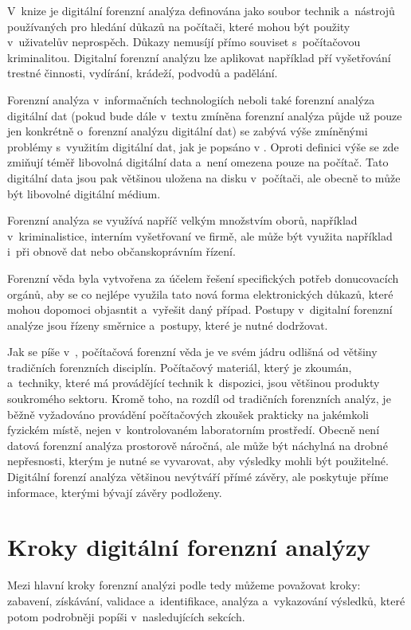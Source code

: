\documentclass[thesis=B,czech]{FITthesis}[2012/06/26]
\begin{document}
V~knize \cite{RECHAndBook} je digitální forenzní analýza definována jako soubor technik a~nástrojů používaných pro hledání důkazů na počítači, které mohou být použity v~uživatelův neprospěch. Důkazy nemusíjí přímo souviset s~počítačovou kriminalitou. Digitalní forenzní analýzu lze aplikovat například pří vyšetřování trestné činnosti, vydírání, krádeží, podvodů a padělání.

Forenzní analýza v~informačních technologiích neboli také forenzní analýza digitální dat (pokud bude dále v~textu zmíněna forenzní analýza půjde už pouze jen konkrétně o~forenzní analýzu digitální dat) se zabývá výše zmíněnými problémy s~využitím digitální dat, jak je popsáno v \cite{for_root}. Oproti definici výše se zde zmiňují téměř libovolná digitální data a~není omezena pouze na počítač. Tato digitální data jsou pak většinou uložena na disku v~počítači, ale obecně to může být libovolné digitální médium.

Forenzní analýza se využívá napříč velkým množstvím oborů, například v~kriminalistice, interním vyšetřovaní ve firmě, ale může být využita například i~při obnově dat nebo občanskoprávním řízení.

Forenzní věda byla vytvořena za účelem řešení specifických potřeb donucovacích orgánů, aby se co nejlépe využila tato nová forma elektronických důkazů, které mohou dopomoci objasntit a~vyřešit daný případ. Postupy v~digitalní forenzní analýze jsou řízeny směrnice a~postupy, které je nutné dodržovat.

Jak se píše v~\cite{for_uvod}, počítačová forenzní věda je ve svém jádru odlišná od většiny tradičních forenzních disciplín. Počítačový materiál, který je zkoumán, a~techniky, které má provádějící technik k~dispozici, jsou většinou produkty soukromého sektoru. Kromě toho, na rozdíl od tradičních forenzních analýz, je běžně vyžadováno provádění počítačových zkoušek prakticky na jakémkoli fyzickém místě, nejen v~kontrolovaném laboratorním prostředí. Obecně není datová forenzní analýza prostorově náročná, ale může být náchylná na drobné nepřesnosti, kterým je nutné se vyvarovat, aby výsledky mohli být použitelné. Digitální forenzí analýza většinou nevýtváří přímé závěry, ale poskytuje příme informace, kterými bývají závěry podloženy.


\section{Kroky digitální forenzní analýzy}
Mezi hlavní kroky forenzní analýzi podle \cite{carroll2008computer} tedy můžeme považovat kroky: zabavení, získávání, validace a~identifikace, analýza a~vykazování výsledků, které potom podrobněji popíši v~nasledujících sekcích.
\end{document}
